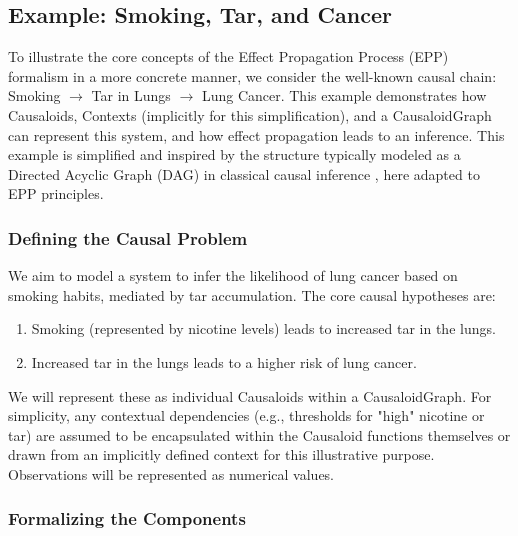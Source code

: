 
\subsection{Example: Smoking, Tar, and Cancer}
\label{sec:formalization_example_smoking_tar_cancer}

To illustrate the core concepts of the Effect Propagation Process (EPP) formalism in a more concrete manner, we consider the well-known causal chain: Smoking \(\rightarrow\) Tar in Lungs \(\rightarrow\) Lung Cancer. This example demonstrates how Causaloids, Contexts (implicitly for this simplification), and a CausaloidGraph can represent this system, and how effect propagation leads to an inference. This example is simplified and inspired by the structure typically modeled as a Directed Acyclic Graph (DAG) in classical causal inference \cite{pearl2000causality}, here adapted to EPP principles.

    \subsubsection{Defining the Causal Problem}
    \label{ssec:example_problem_definition}
    We aim to model a system to infer the likelihood of lung cancer based on smoking habits, mediated by tar accumulation. The core causal hypotheses are:
    \begin{enumerate}
        \item Smoking (represented by nicotine levels) leads to increased tar in the lungs.
        \item Increased tar in the lungs leads to a higher risk of lung cancer.
    \end{enumerate}
    We will represent these as individual Causaloids within a CausaloidGraph. For simplicity, any contextual dependencies (e.g., thresholds for "high" nicotine or tar) are assumed to be encapsulated within the Causaloid functions themselves or drawn from an implicitly defined context for this illustrative purpose. Observations will be represented as numerical values.

    \subsubsection{Formalizing the Components}
    \label{ssec:example_formal_components}

